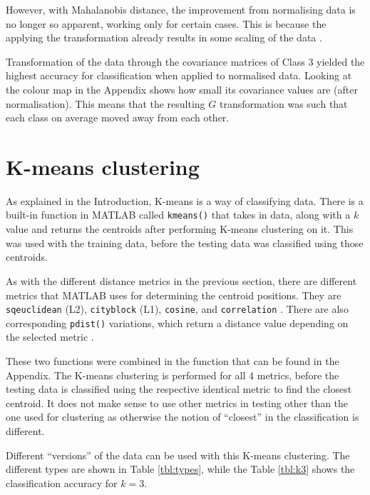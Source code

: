 \documentclass[a4paper, 10pt, conference]{ieeeconf}
\begin{document}
However, with Mahalanobis distance, the improvement from normalising data is no longer so apparent, working only for certain cases. This is because the applying the transformation already results in some scaling of the data \cite{metrics}.

Transformation of the data through the covariance matrices of Class 3 yielded the highest accuracy for classification when applied to normalised data. Looking at the colour map in the Appendix shows how small its covariance values are (after normalisation). This means that the resulting $G$ transformation was such that each class on average moved away from each other.

\section{K-means clustering}

As explained in the Introduction, K-means is a way of classifying data. There is a built-in function in MATLAB called \texttt{kmeans()} that takes in data, along with a $k$ value and returns the centroids after performing K-means clustering on it. This was used with the training data, before the testing data was classified using those centroids.

As with the different distance metrics in the previous section, there are different metrics that MATLAB uses for determining the centroid positions. They are \texttt{sqeuclidean} (L2), \texttt{cityblock} (L1), \texttt{cosine}, and \texttt{correlation} \cite{kmeans}. There are also corresponding \texttt{pdist()} variations, which return a distance value depending on the selected metric \cite{pdist}.

These two functions were combined in the function that can be found in the Appendix. The K-means clustering is performed for all 4 metrics, before the testing data is classified using the respective identical metric to find the closest centroid. It does not make sense to use other metrics in testing other than the one used for clustering as otherwise the notion of ``closest'' in the classification is different.

Different ``versions'' of the data can be used with this K-means clustering. The different types are shown in Table \ref{tbl:types}, while the Table \ref{tbl:k3} shows the classification accuracy for $k=3$.
\end{document}
